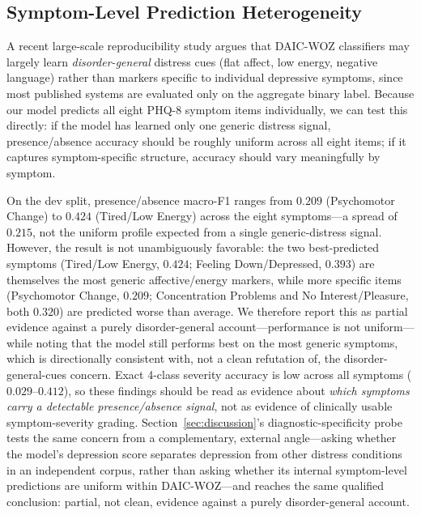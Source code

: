 \documentclass[journal]{IEEEtran}
\begin{document}
\subsection{Symptom-Level Prediction Heterogeneity}
\label{sec:symptom}

A recent large-scale reproducibility study argues that DAIC-WOZ
classifiers may largely learn \emph{disorder-general} distress cues
(flat affect, low energy, negative language) rather than markers
specific to individual depressive symptoms, since most published
systems are evaluated only on the aggregate binary label. Because our
model predicts all eight PHQ-8 symptom items individually, we can test
this directly: if the model has learned only one generic distress
signal, presence/absence accuracy should be roughly uniform across
all eight items; if it captures symptom-specific structure, accuracy
should vary meaningfully by symptom.

On the dev split, presence/absence macro-F1 ranges from $0.209$
(Psychomotor Change) to $0.424$ (Tired/Low Energy) across the eight
symptoms---a spread of $0.215$, not the uniform profile expected from
a single generic-distress signal. However, the result is not
unambiguously favorable: the two best-predicted symptoms (Tired/Low
Energy, $0.424$; Feeling Down/Depressed, $0.393$) are themselves the
most generic affective/energy markers, while more specific items
(Psychomotor Change, $0.209$; Concentration Problems and No
Interest/Pleasure, both $0.320$) are predicted worse than average. We
therefore report this as partial evidence against a purely
disorder-general account---performance is not uniform---while noting
that the model still performs best on the most generic symptoms,
which is directionally consistent with, not a clean refutation of,
the disorder-general-cues concern. Exact 4-class severity accuracy is
low across all symptoms ($0.029$--$0.412$), so these findings should
be read as evidence about \emph{which symptoms carry a detectable
presence/absence signal}, not as evidence of clinically usable
symptom-severity grading. Section~\ref{sec:discussion}'s
diagnostic-specificity probe tests the same concern from a
complementary, external angle---asking whether the model's depression
score separates depression from other distress conditions in an
independent corpus, rather than asking whether its internal
symptom-level predictions are uniform within DAIC-WOZ---and reaches
the same qualified conclusion: partial, not clean, evidence against a
purely disorder-general account.
\end{document}
